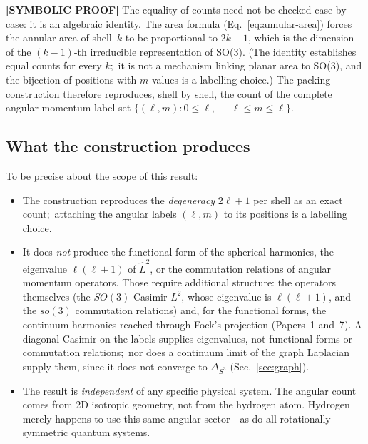 \documentclass[aps,prl,reprint,amsmath,amssymb]{revtex4-2}
\begin{document}
\textbf{[SYMBOLIC PROOF]} The equality of counts need not be checked case by case: it is an
algebraic identity.  The area formula
(Eq.~\ref{eq:annular-area}) forces the annular area of shell~$k$ to
be proportional to $2k-1$, which is the dimension of the
$(k{-}1)$-th irreducible representation of SO(3).  (The identity
establishes equal counts for every $k$;\ it is not a mechanism linking
planar area to SO(3), and the bijection of positions with $m$ values is
a labelling choice.)  The packing construction therefore reproduces,
shell by shell, the count of the complete angular momentum label set
$\{(\ell, m) : 0 \leq \ell, \; -\ell \leq m \leq \ell\}$.

\subsection{What the construction produces}

To be precise about the scope of this result:

\begin{itemize}
\item The construction reproduces the \emph{degeneracy} $2\ell + 1$
  per shell as an exact count;\ attaching the angular labels
  $(\ell, m)$ to its positions is a labelling choice.

\item It does \emph{not} produce the functional form of the spherical
  harmonics, the eigenvalue $\ell(\ell+1)$ of $\hat{L}^2$, or the
  commutation relations of angular momentum operators.  Those require
  additional structure: the operators themselves (the $SO(3)$ Casimir
  $L^2$, whose eigenvalue is $\ell(\ell+1)$, and the $so(3)$ commutation
  relations) and, for the functional forms, the continuum harmonics
  reached through Fock's projection (Papers~1 and~7).  A diagonal
  Casimir on the labels supplies eigenvalues, not functional forms or
  commutation relations;\ nor does a continuum limit of the graph
  Laplacian supply them, since it does not converge to $\Delta_{S^3}$
  (Sec.~\ref{sec:graph}).

\item The result is \emph{independent} of any specific physical
  system.  The angular count comes from 2D isotropic geometry,
  not from the hydrogen atom.  Hydrogen merely happens to use this
  same angular sector---as do all rotationally symmetric quantum
  systems.
\end{itemize}


\end{document}
